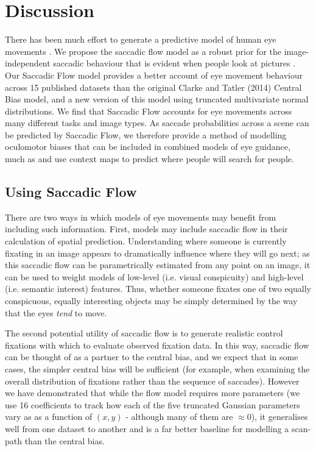 \documentclass[a4paper, twocolumn, oneside, 11pt]{article}
\begin{document}


\section{Discussion}

There has been much effort to generate a predictive model of human eye movements \citep{mit-saliency-benchmark,judd2009}. We propose the saccadic flow model as a robust prior for the image-independent saccadic behaviour that is evident when people look at pictures \citep{tatler-vincent2009}. Our Saccadic Flow model provides a better account of eye movement behaviour across 15 published datasets than the original Clarke and Tatler (2014) Central Bias model, and a new version of this model using truncated multivariate normal distributions. We find that Saccadic Flow accounts for eye movements across many different tasks and image types. As saccade probabilities across a scene can be predicted by Saccadic Flow, we therefore provide a method of modelling oculomotor biases that can be included in combined models of eye guidance, much as \cite{torralba2006} and \cite{ehinger2009} use context maps to predict where people will search for people.

\subsection{Using Saccadic Flow}
There are two ways in which models of eye movements may benefit from including such information. First, models may include saccadic flow in their calculation of spatial prediction. Understanding where someone is currently fixating in an image appears to dramatically influence where they will go next; as this saccadic flow can be parametrically estimated from any point on an image, it can be used to weight models of low-level (i.e. visual conspicuity) and high-level (i.e. semantic interest) features. Thus, whether someone fixates one of two equally conspicuous, equally interesting objects may be simply determined by the way that the eyes \textit{tend} to move. 

The second potential utility of saccadic flow is to generate realistic control fixations with which to evaluate observed fixation data. In this way, saccadic flow can be thought of as a partner to the \cite{clarke-tatler2014} central bias, and we expect that in some cases, the simpler central bias will be sufficient (for example, when examining the overall distribution of fixations rather than the sequence of saccades). However we have demonstrated that while the flow model requires more parameters (we use 16 coefficients to track how each of the five truncated Gaussian parameters vary as as a function of $(x,y)$ - although many of them are $\approx 0$), it generalises well from one dataset to another and is a far better baseline for modelling a scan-path than the central bias.
\end{document}
